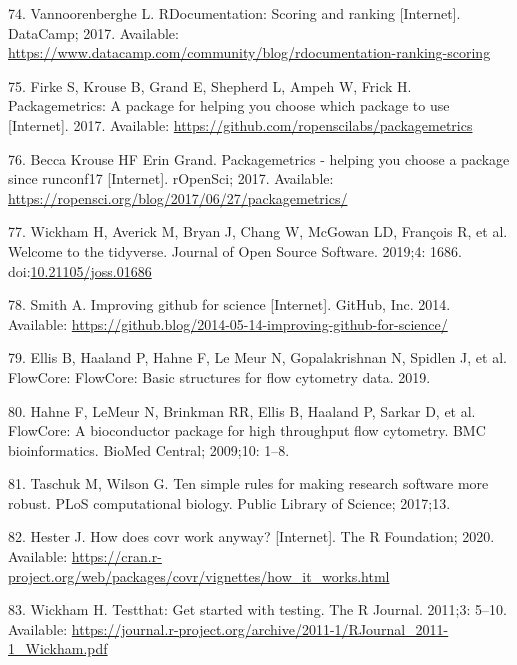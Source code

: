 \documentclass[10pt,letterpaper]{article}
\begin{document}
\leavevmode\hypertarget{ref-vannoorenberghe2017}{}%
74. Vannoorenberghe L. RDocumentation: Scoring and ranking
{[}Internet{]}. DataCamp; 2017. Available:
\url{https://www.datacamp.com/community/blog/rdocumentation-ranking-scoring}

\leavevmode\hypertarget{ref-packagemetrics}{}%
75. Firke S, Krouse B, Grand E, Shepherd L, Ampeh W, Frick H.
Packagemetrics: A package for helping you choose which package to use
{[}Internet{]}. 2017. Available:
\url{https://github.com/ropenscilabs/packagemetrics}

\leavevmode\hypertarget{ref-packagemetricsblog}{}%
76. Becca Krouse HF Erin Grand. Packagemetrics - helping you choose a
package since runconf17 {[}Internet{]}. rOpenSci; 2017. Available:
\url{https://ropensci.org/blog/2017/06/27/packagemetrics/}

\leavevmode\hypertarget{ref-tidyverse}{}%
77. Wickham H, Averick M, Bryan J, Chang W, McGowan LD, François R, et
al. Welcome to the tidyverse. Journal of Open Source Software. 2019;4:
1686.
doi:\href{https://doi.org/10.21105/joss.01686}{10.21105/joss.01686}

\leavevmode\hypertarget{ref-smith2014}{}%
78. Smith A. Improving github for science {[}Internet{]}. GitHub, Inc.
2014. Available:
\url{https://github.blog/2014-05-14-improving-github-for-science/}

\leavevmode\hypertarget{ref-flowCore}{}%
79. Ellis B, Haaland P, Hahne F, Le Meur N, Gopalakrishnan N, Spidlen J,
et al. FlowCore: FlowCore: Basic structures for flow cytometry data.
2019.

\leavevmode\hypertarget{ref-hahne2009}{}%
80. Hahne F, LeMeur N, Brinkman RR, Ellis B, Haaland P, Sarkar D, et al.
FlowCore: A bioconductor package for high throughput flow cytometry. BMC
bioinformatics. BioMed Central; 2009;10: 1--8.

\leavevmode\hypertarget{ref-taschuk2017}{}%
81. Taschuk M, Wilson G. Ten simple rules for making research software
more robust. PLoS computational biology. Public Library of Science;
2017;13.

\leavevmode\hypertarget{ref-hester2020}{}%
82. Hester J. How does covr work anyway? {[}Internet{]}. The R
Foundation; 2020. Available:
\url{https://cran.r-project.org/web/packages/covr/vignettes/how_it_works.html}

\leavevmode\hypertarget{ref-wickham2011}{}%
83. Wickham H. Testthat: Get started with testing. The R Journal.
2011;3: 5--10. Available:
\url{https://journal.r-project.org/archive/2011-1/RJournal_2011-1_Wickham.pdf}
\end{document}
